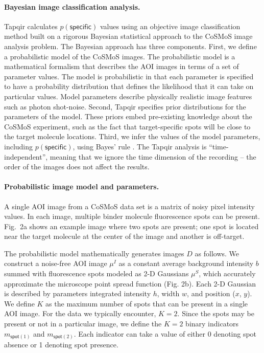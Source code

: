 \paragraph{Bayesian image classification analysis.}
Tapqir calculates $p(\mathsf{specific})$ values using an objective image classification method built on a rigorous Bayesian statistical approach to the CoSMoS image analysis problem. The Bayesian approach has three components. First, we define a probabilistic model of the CoSMoS images. The probabilistic model is a mathematical formalism that describes the AOI images in terms of a set of parameter values.  The model is probabilistic in that each parameter is specified to have a probability distribution that defines the likelihood that it can take on particular values. Model parameters describe physically realistic image features such as photon shot-noise. Second, Tapqir specifies prior distributions for the parameters of the model. These priors embed pre-existing knowledge about the CoSMoS experiment, such as the fact that target-specific spots will be close to the target molecule locations. Third, we infer the values of the model parameters, including $p(\mathsf{specific})$, using Bayes' rule \cite{Bishop2006-oa}. The Tapqir analysis is “time-independent”, meaning that we ignore the time dimension of the recording -- the order of the images does not affect the results. 

\paragraph{Probabilistic image model and parameters.} %
A single AOI image from a CoSMoS data set is a matrix of noisy pixel intensity values.  In each image, multiple binder molecule fluorescence spots can be present. Fig.~2a shows an example image where two spots are present; one spot is located near the target molecule at the center of the image and another is off-target. 

The probabilistic model mathematically generates images $D$ as follows.  We construct a noise-free AOI image $\mu^I$ as a constant average background intensity $b$ summed with fluorescence spots modeled as 2-D Gaussians $\mu^S$, which accurately approximate the microscope point spread function \cite{Zhang2007-rb} (Fig. 2b). Each 2-D Gaussian is described by parameters integrated intensity $h$, width $w$, and position ($x$, $y$). We define $K$ as the maximum number of spots that can be present in a single AOI image.  For the data we typically encounter, $K = 2$. Since the spots may be present or not in a particular image, we define the $K = 2$ binary indicators $m_{\mathsf{spot}(1)}$ and $m_{\mathsf{spot}(2)}$.  Each indicator can take a value of either 0 denoting spot absence or 1 denoting spot presence. 

